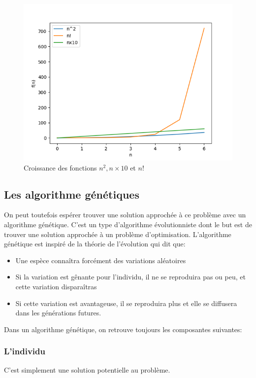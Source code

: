 \documentclass[12pt]{article}
\begin{document}
\begin{figure}[H]
\centering
\includegraphics[width=.9\linewidth]{./complexite.png}
\caption{Croissance des fonctions $n^2, n \times 10$ et $n!$}
\end{figure}

\subsection{Les algorithme génétiques}
\label{sec-1-2}

On peut toutefois espérer trouver une solution approchée à ce problème avec un algorithme génétique.
C'est un type d'algorithme évolutionniste dont le but est de trouver une solution approchée à un problème d'optimisation.
L'algorithme génétique est inspiré de la théorie de l'évolution qui dit que:
\begin{itemize}
\item Une espèce connaîtra forcément des variations aléatoires
\item Si la variation est gênante pour l'individu, il ne se reproduira pas ou peu, et cette variation disparaîtras
\item Si cette variation est avantageuse, il se reproduira plus et elle se diffusera dans les générations futures.
\end{itemize}

Dans un algorithme génétique, on retrouve toujours les composantes suivantes:

\subsubsection{L'individu}

C'est simplement une solution potentielle au problème.
\end{document}
